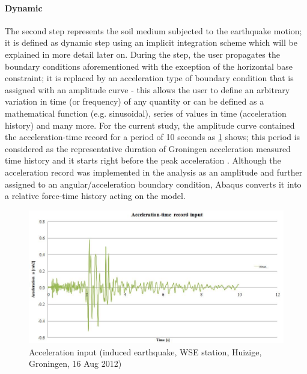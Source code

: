 	\paragraph{Dynamic}
	The second step represents the soil medium subjected to the earthquake motion; it is defined as dynamic step using an implicit integration scheme which will be explained in more detail later on. During the step, the user propagates the boundary conditions aforementioned with the exception of the horizontal base constraint; it is replaced by an acceleration type of boundary condition that is assigned with an amplitude curve - this allows the user to define an arbitrary variation in time (or frequency) of any quantity or can be defined as a mathematical function (e.g. sinusoidal), series of values in time (acceleration history) and many more. For the current study, the amplitude curve contained the acceleration-time record for a period of 10 seconds as \ref{Acceleration} shows; this period is considered as the representative duration of Groningen acceleration measured time history and it starts right before the peak acceleration \cite{dost2004scaling}. Although the acceleration record was implemented in the analysis as an amplitude and further assigned to an angular/acceleration boundary condition, Abaqus converts it into a relative force-time history acting on the model. 
	
	\begin{figure}[h!]
		\centering
		\includegraphics[width=0.7\linewidth]{"Acc input"}
		\caption{Acceleration input (induced earthquake, WSE station, Huizige, Groningen, 16 Aug 2012)}
		\label{Acceleration}
	\end{figure}
	
	\newpage
